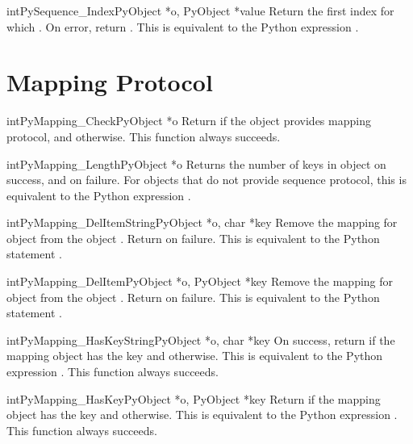 \documentclass{manual}
\begin{document}
\begin{cfuncdesc}{int}{PySequence_Index}{PyObject *o, PyObject *value}
Return the first index  for which .  On error, return .    This is equivalent to
the Python expression .
\end{cfuncdesc}


\section{Mapping Protocol \label{mapping}}

\begin{cfuncdesc}{int}{PyMapping_Check}{PyObject *o}
Return  if the object provides mapping protocol, and 
otherwise.  
This function always succeeds.
\end{cfuncdesc}


\begin{cfuncdesc}{int}{PyMapping_Length}{PyObject *o}
Returns the number of keys in object  on success, and 
on failure.  For objects that do not provide sequence protocol,
this is equivalent to the Python expression .
\end{cfuncdesc}


\begin{cfuncdesc}{int}{PyMapping_DelItemString}{PyObject *o, char *key}
Remove the mapping for object  from the object .
Return  on failure.  This is equivalent to
the Python statement .
\end{cfuncdesc}


\begin{cfuncdesc}{int}{PyMapping_DelItem}{PyObject *o, PyObject *key}
Remove the mapping for object  from the object .
Return  on failure.  This is equivalent to
the Python statement .
\end{cfuncdesc}


\begin{cfuncdesc}{int}{PyMapping_HasKeyString}{PyObject *o, char *key}
On success, return  if the mapping object has the key 
and  otherwise.  This is equivalent to the Python expression
. 
This function always succeeds.
\end{cfuncdesc}


\begin{cfuncdesc}{int}{PyMapping_HasKey}{PyObject *o, PyObject *key}
Return  if the mapping object has the key  and
 otherwise.  This is equivalent to the Python expression
. 
This function always succeeds.
\end{cfuncdesc}
\end{document}
